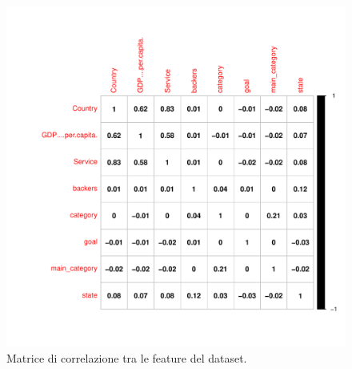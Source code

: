 \begin{figure}
	\centering
	\includegraphics[width=1\linewidth]{../FinalResults/Images/Data_exploration_plots/corrplot}
	\caption{Matrice di correlazione tra le feature del dataset.}
	\label{fig:corrplot}
\end{figure}

